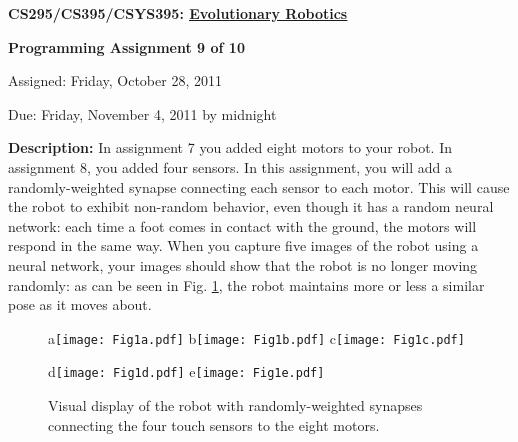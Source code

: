 \documentclass[12pt]{article}
\begin{document}
\centerline{\bf \Large CS295/CS395/CSYS395: \href{CS295_395_Syllabus.pdf}{\underline{Evolutionary Robotics}}}

\vspace{0.5cm}

\centerline{\bf \large Programming Assignment 9 of 10}

\vspace{0.5cm}

\centerline{\large Assigned: Friday, October 28, 2011}

\vspace{0.5cm}

\centerline{\large Due: Friday, November 4, 2011 by midnight}

\vspace{0.5cm}

\noindent \textbf{Description:} In assignment 7 you added eight motors to your robot. In assignment 8, you added four sensors. In this assignment, you will add a randomly-weighted synapse connecting each sensor to each motor. This will cause the robot to exhibit non-random behavior, even though it has a random neural network: each time a foot comes in contact with the ground, the motors will respond in the same way. When you capture five images of the robot using a neural network, your images should show that the robot is no longer moving randomly: as can be seen in Fig. \ref{Fig1}, the robot maintains more or less a similar pose as it moves about.

\begin{figure}
\centerline{
a\texttt{[image: Fig1a.pdf]}
b\texttt{[image: Fig1b.pdf]}
c\texttt{[image: Fig1c.pdf]}}
\centerline{
d\texttt{[image: Fig1d.pdf]}
e\texttt{[image: Fig1e.pdf]}}
\caption{Visual display of the robot with randomly-weighted synapses connecting the four touch sensors to the eight motors.}
\label{Fig1}
\end{figure}
\end{document}
